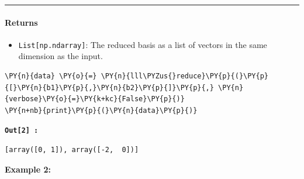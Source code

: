 \documentclass[a4paper,12pt]{article}
\begin{document}
\begin{tcolorbox}[breakable, size=fbox, boxrule=1pt, pad at break*=1mm,colback=cellbackground, colframe=cellborder]
\begin{center}\rule{0.5\linewidth}{0.5pt}\end{center}

\paragraph{ Returns}\label{returns}

\begin{itemize}
\tightlist
\item
  \texttt{List{[}np.ndarray{]}}: The reduced basis as a list of vectors
  in the same dimension as the input.
\end{itemize}
\end{tcolorbox}

    \begin{tcolorbox}[breakable, size=fbox, boxrule=1pt, pad at break*=1mm,colback=cellbackground, colframe=cellborder]
\begin{Verbatim}[commandchars=\\\{\}]
\PY{n}{data} \PY{o}{=} \PY{n}{lll\PYZus{}reduce}\PY{p}{(}\PY{p}{[}\PY{n}{b1}\PY{p}{,}\PY{n}{b2}\PY{p}{]}\PY{p}{,} \PY{n}{verbose}\PY{o}{=}\PY{k+kc}{False}\PY{p}{)}
\PY{n+nb}{print}\PY{p}{(}\PY{n}{data}\PY{p}{)}
\end{Verbatim}



\end{tcolorbox}

\begin{tcolorbox}[colback=white, colframe=gray!60, boxrule=0.5pt]
\texttt{\textbf{Out[2] :}}

    \begin{Verbatim}[commandchars=\\\{\}]
[array([0, 1]), array([-2,  0])]
    \end{Verbatim}
\end{tcolorbox}











\textbf{Example 2:} 
\end{document}
